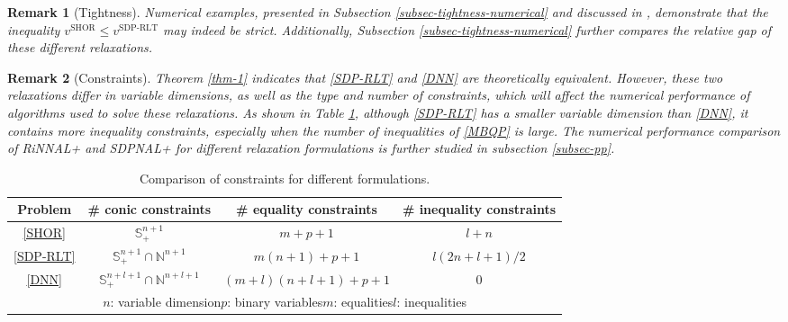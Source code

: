 \documentclass[11pt]{article}
\theoremstyle{plain}
\newtheorem{remark}{Remark}
\def\bN{\mathbb{N}}
\def\S{\mathbb{S}}
\begin{document}
\begin{remark}[Tightness]
    Numerical examples, presented in Subsection \ref{subsec-tightness-numerical} and discussed in \cite[Section 6]{kim2022doubly}, demonstrate that the inequality $v^{\text{SHOR}} \leq v^{\text{SDP-RLT}}$ may indeed be strict. Additionally, Subsection \ref{subsec-tightness-numerical} further compares the relative gap of these different relaxations.
\end{remark}
\begin{remark}[Constraints]
Theorem \ref{thm-1} indicates that \eqref{SDP-RLT} and \eqref{DNN} are theoretically equivalent. However, these two relaxations differ in variable dimensions, as well as the type and number of constraints, which will affect the numerical performance of algorithms used to solve these relaxations. As shown in Table \ref{tab-comparison}, although \eqref{SDP-RLT} has a smaller variable dimension than \eqref{DNN}, it contains more inequality constraints, especially when the number of inequalities of \eqref{MBQP} is large. The numerical performance comparison of RiNNAL+ and SDPNAL+ for different relaxation formulations is further studied in subsection \ref{subsec-pp}.
\end{remark}	

\begin{center}
\begin{table}[h!]
\begin{center}
    \def\arraystretch{1.5}
    \setlength{\tabcolsep}{5pt} 
    \begin{tabular}{|c|c|c|c|} 
     \hline
    \multicolumn{1}{|c|}{Problem} & \# conic constraints  & \# equality constraints & \# inequality constraints   \\ 
     \hline
     \eqref{SHOR}  & $\S_+^{n+1}$   &   $m+p+1$ & $l+n$ \\ 
     \hline
     \eqref{SDP-RLT}  & $\S_+^{n+1}\cap\bN^{n+1}$   &   $m(n+1)+p+1$ & ${l(2n+l+1)}/{2}$ \\ 
     \hline
     \eqref{DNN} & $\S_+^{n+l+1}\cap\bN^{n+l+1}$  &  $(m+l)(n+l+1)+p+1$ &  $0$ \\ 
     \hline    
      \multicolumn{4}{|c|}{$n$: variable dimension\quad $p$: binary variables\quad $m$: equalities\quad $l$: inequalities}\\
     \hline
     \end{tabular}
    \caption{Comparison of constraints for different formulations.}
    \label{tab-comparison}
\end{center}
\end{table}
\end{center}
\end{document}
